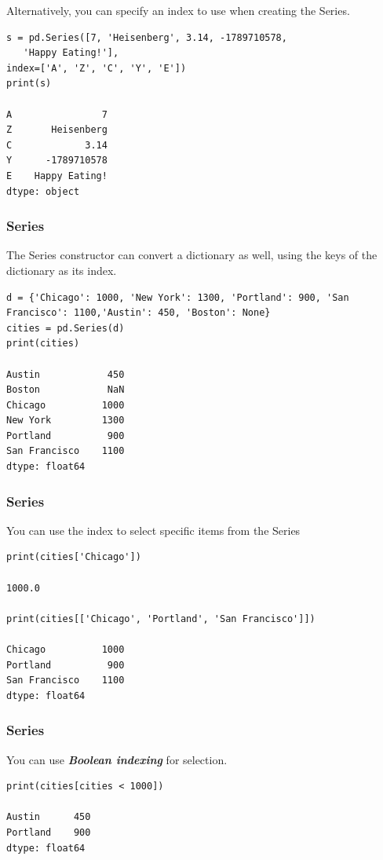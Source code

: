 \begin{frame}[fragile]
Alternatively, you can specify an index to use when creating the Series.
\begin{lstlisting}
s = pd.Series([7, 'Heisenberg', 3.14, -1789710578,
   'Happy Eating!'],
index=['A', 'Z', 'C', 'Y', 'E'])
print(s)

A                7
Z       Heisenberg
C             3.14
Y      -1789710578
E    Happy Eating!
dtype: object
\end{lstlisting}
\end{frame}

\begin{frame}[fragile]\frametitle{Series}		
The Series constructor can convert a dictionary as well, using the keys of the dictionary as its index.
\begin{lstlisting}
d = {'Chicago': 1000, 'New York': 1300, 'Portland': 900, 'San Francisco': 1100,'Austin': 450, 'Boston': None}
cities = pd.Series(d)
print(cities)

Austin            450
Boston            NaN
Chicago          1000
New York         1300
Portland          900
San Francisco    1100
dtype: float64
\end{lstlisting}
\end{frame}

\begin{frame}[fragile]\frametitle{Series}		
You can use the index to select specific items from the Series 
\begin{lstlisting}
print(cities['Chicago'])

1000.0

print(cities[['Chicago', 'Portland', 'San Francisco']])

Chicago          1000
Portland          900
San Francisco    1100
dtype: float64
\end{lstlisting}
\end{frame}

\begin{frame}[fragile]\frametitle{Series}		
You can use \textbf{\textit{Boolean indexing}} for selection.
\begin{lstlisting}
print(cities[cities < 1000])

Austin      450
Portland    900
dtype: float64
\end{lstlisting}
\end{frame}

